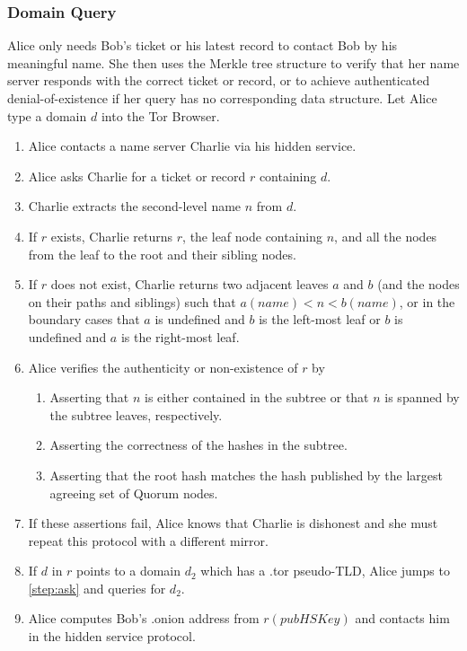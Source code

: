 \documentclass[USenglish,oneside,twocolumn]{article}
\begin{document}

\subsubsection{Domain Query}

Alice only needs Bob's ticket or his latest record to contact Bob by his meaningful name. She then uses the Merkle tree structure to verify that her name server responds with the correct ticket or record, or to achieve authenticated denial-of-existence if her query has no corresponding data structure. Let Alice type a domain $ d $ into the Tor Browser.

\begin{enumerate}
	\item Alice contacts a name server Charlie via his hidden service.
	\item \label{step:ask} Alice asks Charlie for a ticket or record $ r $ containing $ d $.
	\item Charlie extracts the second-level name $ n $ from $ d $.
	\item If $ r $ exists, Charlie returns $ r $, the leaf node containing $ n $, and all the nodes from the leaf to the root and their sibling nodes.
	\item If $ r $ does not exist, Charlie returns two adjacent leaves $ a $ and $ b $ (and the nodes on their paths and siblings) such that $ a(\mathit{name}) < n < b(\mathit{name}) $, or in the boundary cases that $ a $ is undefined and $ b $ is the left-most leaf or $ b $ is undefined and $ a $ is the right-most leaf.
	\item Alice verifies the authenticity or non-existence of $ r $ by 
		\begin{enumerate}
			\item Asserting that $ n $ is either contained in the subtree or that $ n $ is spanned by the subtree leaves, respectively.
			\item Asserting the correctness of the hashes in the subtree.
			\item Asserting that the root hash matches the hash published by the largest agreeing set of Quorum nodes. %
		\end{enumerate}
	\item If these assertions fail, Alice knows that Charlie is dishonest and she must repeat this protocol with a different mirror.
	\item If $ d $ in $ r $ points to a domain $ d_{2} $ which has a .tor pseudo-TLD, Alice jumps to \ref{step:ask} and queries for $ d_{2} $.
	\item Alice computes Bob's .onion address from $ r(\mathit{pubHSKey}) $ and contacts him in the hidden service protocol.
\end{enumerate}
\end{document}

